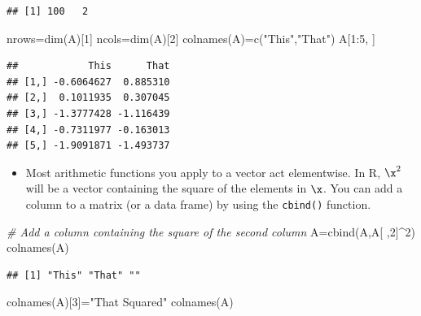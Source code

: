 \documentclass[
]{article}
\newenvironment{Shaded}{\begin{snugshade}}{\end{snugshade}}
\newcommand{\CommentTok}[1]{\textcolor[rgb]{0.56,0.35,0.01}{\textit{#1}}}
\newcommand{\DecValTok}[1]{\textcolor[rgb]{0.00,0.00,0.81}{#1}}
\newcommand{\FunctionTok}[1]{\textcolor[rgb]{0.00,0.00,0.00}{#1}}
\newcommand{\NormalTok}[1]{#1}
\newcommand{\OtherTok}[1]{\textcolor[rgb]{0.56,0.35,0.01}{#1}}
\newcommand{\SpecialCharTok}[1]{\textcolor[rgb]{0.00,0.00,0.00}{#1}}
\newcommand{\StringTok}[1]{\textcolor[rgb]{0.31,0.60,0.02}{#1}}
\providecommand{\tightlist}{%
  \setlength{\itemsep}{0pt}\setlength{\parskip}{0pt}}
\theoremstyle{definition}
\theoremstyle{definition}
\theoremstyle{definition}
\theoremstyle{definition}
\theoremstyle{remark}
\begin{document}
\begin{verbatim}
## [1] 100   2
\end{verbatim}

\begin{Shaded}
\begin{Highlighting}[]
\NormalTok{nrows}\OtherTok{=}\FunctionTok{dim}\NormalTok{(A)[}\DecValTok{1}\NormalTok{]}
\NormalTok{ncols}\OtherTok{=}\FunctionTok{dim}\NormalTok{(A)[}\DecValTok{2}\NormalTok{]}
\FunctionTok{colnames}\NormalTok{(A)}\OtherTok{=}\FunctionTok{c}\NormalTok{(}\StringTok{"This"}\NormalTok{,}\StringTok{"That"}\NormalTok{)}
\NormalTok{A[}\DecValTok{1}\SpecialCharTok{:}\DecValTok{5}\NormalTok{, ]}
\end{Highlighting}
\end{Shaded}

\begin{verbatim}
##            This      That
## [1,] -0.6064627  0.885310
## [2,]  0.1011935  0.307045
## [3,] -1.3777428 -1.116439
## [4,] -0.7311977 -0.163013
## [5,] -1.9091871 -1.493737
\end{verbatim}

\begin{itemize}
\tightlist
\item
  Most arithmetic functions you apply to a vector act elementwise. In R, \(\x^2\) will be a vector containing the square of the elements in \(\x\). You can add a column to a matrix (or a data frame) by using the \texttt{cbind()} function.
\end{itemize}

\begin{Shaded}
\begin{Highlighting}[]
\CommentTok{\# Add a column containing the square of the second column}
\NormalTok{A}\OtherTok{=}\FunctionTok{cbind}\NormalTok{(A,A[ ,}\DecValTok{2}\NormalTok{]}\SpecialCharTok{\^{}}\DecValTok{2}\NormalTok{)}
\FunctionTok{colnames}\NormalTok{(A)}
\end{Highlighting}
\end{Shaded}

\begin{verbatim}
## [1] "This" "That" ""
\end{verbatim}

\begin{Shaded}
\begin{Highlighting}[]
\FunctionTok{colnames}\NormalTok{(A)[}\DecValTok{3}\NormalTok{]}\OtherTok{=}\StringTok{"That Squared"}
\FunctionTok{colnames}\NormalTok{(A)}
\end{Highlighting}
\end{Shaded}
\end{document}

